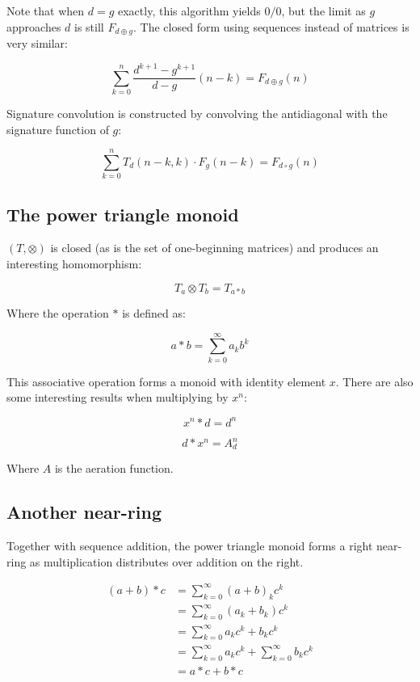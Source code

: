 \documentclass{article}
\begin{document}
\noindent Note that when $d = g$ exactly, this algorithm yields $0/0$, but the limit as $g$ approaches $d$ is still $F_{d \oplus g}$. The closed form using sequences instead of matrices is very similar:

$$ \sum_{k=0}^{n} \frac{d^{k+1} - g^{k+1}}{d - g}(n-k) = F_{d \oplus g} (n)$$

\noindent Signature convolution is constructed by convolving the antidiagonal with the signature function of $g$:

$$\sum_{k=0}^{n} T_d (n-k, k) \cdot F_g (n-k) = F_{d \circ g}(n)$$

\subsection{The power triangle monoid}

\noindent $(T, \otimes)$ is closed (as is the set of one-beginning matrices) and produces an interesting homomorphism:

$$ T_a \otimes T_b = T_{a * b}$$

\noindent Where the operation $*$ is defined as:

$$a * b = \sum_{k=0}^{\infty} a_k b^k$$

\noindent This associative operation forms a monoid with identity element $x$. There are also some interesting results when multiplying by $x^n$:

$$x^n * d = d^n$$

$$d * x^n = A_d^n$$

\noindent Where $A$ is the aeration function.

\subsection{Another near-ring}

\noindent Together with sequence addition, the power triangle monoid forms a right near-ring as multiplication distributes over addition on the right.

\begin{align*}
(a + b) * c &= \sum_{k=0}^{\infty} (a + b)_k c^k\\
&= \sum_{k=0}^{\infty} (a_k + b_k) c^k\\
&= \sum_{k=0}^{\infty} a_k c^k + b_k c^k\\
&= \sum_{k=0}^{\infty} a_k c^k + \sum_{k=0}^{\infty} b_k c^k\\
&= a*c + b*c
\end{align*}
\end{document}
